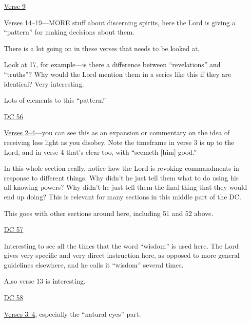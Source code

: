 \begin{compactdesc}
\begin{compactitem}
					\item \hyperref[DC52-9]{Verse 9}
					\item \hyperref[DC52-14]{Verses 14--19}---MORE stuff about discerning spirits, here the Lord is giving a ``pattern'' for making decisions about them.
						\begin{compactitem}
							\item There is a lot going on in these verses that needs to be looked at.
							\item Look at 17, for example---is there a difference between ``revelations'' and ``truths''? Why would the Lord mention them in a series like this if they are identical? Very interesting.
							\item Lots of elements to this ``pattern.''
						\end{compactitem}
				\end{compactitem}
			\item \hyperref[DC56]{DC 56}
				\begin{compactitem}
					\item \hyperref[DC56-2]{Verses 2--4}---you can see this as an expansion or commentary on the idea of receiving less light as you disobey. Note the timeframe in verse 3 is up to the Lord, and in verse 4 that's clear too, with ``seemeth [him] good.'' 
					\item In this whole section really, notice how the Lord is revoking commandments in response to different things. Why didn't he just tell them what to do using his all-knowing powers? Why didn't he just tell them the final thing that they would end up doing? This is relevant for many sections in this middle part of the DC.
					\item This goes with other sections around here, including 51 and 52 above.
				\end{compactitem}
			\item \hyperref[DC57]{DC 57}
				\begin{compactitem}
					\item Interesting to see all the times that the word ``wisdom'' is used here. The Lord gives very specific and very direct instruction here, as opposed to more general guidelines elsewhere, and he calls it ``wisdom'' several times.
					\item Also verse 13 is interesting.
				\end{compactitem}
			\item \hyperref[DC58]{DC 58}
				\begin{compactitem}
					\item \hyperref[DC58-3]{Verses 3--4}, especially the ``natural eyes'' part. 

\end{compactitem}
\end{compactdesc}
